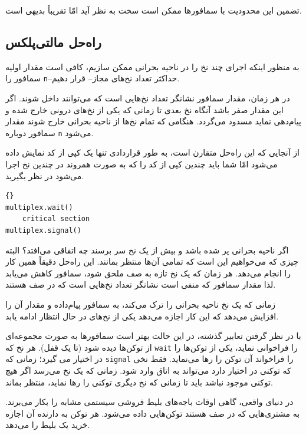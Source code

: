 \documentclass{book}
\newcommand{\clearemptydoublepage}{\newpage\cleardoublepage}
\begin{document}
    تضمین این محدودیت با سمافورها ممکن است سخت به نظر آید امّا تقریباً بدیهی است. 


\clearemptydoublepage
\subsection{ راه‌حل مالتی‌پلکس}



    به منظور اینکه  اجرای چند نخ را در ناحیه بحرانی ممکن سازیم، کافی است مقدار اولیه سمافور را \texttt{n}--حداکثر تعداد نخ‌های مجاز-- قرار دهیم.
    
    در هر زمان، مقدار سمافور نشانگر تعداد نخ‌هایی است که می‌توانند داخل شوند. اگر این مقدار صفر باشد آنگاه 
    نخ بعدی تا زمانی که یکی از نخ‌های درونی خارج شده و پیام‌دهی نماید مسدود می‌گردد. هنگامی که تمام نخ‌ها از ناحیه بحرانی 
    خارج شوند مقدار سمافور دوباره \texttt{n} می‌شود. 
    
    از آنجایی که این راه‌حل متقارن است، به طور قراردادی تنها یک کپی از کد نمایش داده می‌شود امّا شما باید چندین کپی از کد را که به صورت همروند 
    در چندین نخ اجرا می‌شود در نظر بگیرید. 

\begin{latin}
\begin{lstlisting}[title=\rl{ راه‌حل مالتی‌پلکس}]{}
multiplex.wait()
    critical section 
multiplex.signal()      
\end{lstlisting}
\end{latin}

    اگر ناحیه بحرانی پر شده باشد و بیش از یک نخ سر برسند چه اتفاقی می‌افتد؟ البته چیزی که می‌خواهیم این است که تمامی آن‌ها منتظر بمانند. 
    این راه‌حل دقیقاً همین کار را انجام می‌دهد. هر زمان که یک نخ تازه به صف ملحق شود، سمافور کاهش می‌یابد لذا مقدار سمافور که 
    منفی است نشانگر تعداد نخ‌هایی است که در صف هستند. 
    
    زمانی که یک نخ ناحیه بحرانی را ترک می‌کند، به سمافور پیام‌داده و مقدار آن را افزایش می‌دهد که این کار اجازه می‌دهد یکی از نخ‌های در حال انتظار ادامه یابد. 

    با در نظر گرفتن تعابیر گذشته،‌ در این حالت بهتر است سمافورها به صورت مجموعه‌ای از توکن‌ها دیده شود (تا یک قفل). 
    هر نخ که \texttt{wait} را فراخوانی نماید،  یکی از توکن‌ها را در اختیار می گیرد؛‌ زمانی که \texttt{signal} را فراخواند 
    آن توکن را رها می‌نماید. فقط نخی که توکنی در اختیار دارد می‌تواند به اتاق وارد شود.  زمانی که یک نخ می‌رسد اگر هیچ توکنی موجود نباشد 
    باید تا زمانی که نخ دیگری توکنی را رها نماید، منتظر بماند. 

    در دنیای واقعی، گاهی  اوقات باجه‌های بلیط فروشی سیستمی مشابه را بکار می‌برند. 
    به مشتری‌هایی که در صف هستند توکن‌هایی داده می‌شود. هر توکن به دارنده آن اجازه خرید یک بلیط را می‌دهد. 
\end{document}
